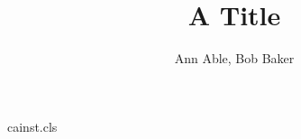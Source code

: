 \begin{filecontents*}[overwrite]{cainst.cls}
\def\inst#1{\unskip$^{#1}$}
\def\institute#1{\gdef\@institute{\it #1}}
\def\institutename{\par\begingroup\parindent=0pt\setcounter{@inst}{1}%
  \def\and{\par\stepcounter{@inst}\noindent$^{\the@inst}$\enspace\ignorespaces}%
  \noindent$^{1}$\enspace\ignorespaces\@institute\par\endgroup}
\def\@maketitle{\begin{center}{\LARGE\@title\par}\vskip1em{\large\@author\par}\end{center}
  {\small\institutename}\vskip1em}
\end{filecontents*}
\documentclass{cainst}

\title{A Title}
\author{Ann Able, Bob Baker}
\maketitle
Text.

